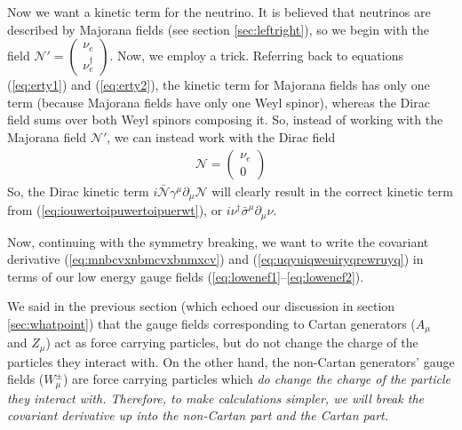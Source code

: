 \documentclass[12pt,epsf]{article}
\def\nolabel{\nonumber }
\def\nolabel{\nonumber }
\begin{document}
Now we want a kinetic term for the neutrino.  It is believed that
neutrinos are described by Majorana fields (see section
\ref{sec:leftright}), so we begin with the field $\mathcal{N}' = 
\begin{pmatrix} \nu_e \\ \nu^{\dagger}_e \end{pmatrix}$.  Now, we
employ a trick.  Referring back to equations (\ref{eq:erty1}) and
(\ref{eq:erty2}), the kinetic term for Majorana fields has only one
term (because Majorana fields have only one Weyl spinor), whereas the
Dirac field sums over both Weyl spinors composing it.  So, instead of
working with the Majorana field $\mathcal{N}'$, we can instead work
with the Dirac field
\begin{eqnarray}
\mathcal{N} = \begin{pmatrix} \nu_e \\ 0\end{pmatrix}\nolabel
\end{eqnarray}
So, the Dirac kinetic term $i \mathcal{\bar N}
\gamma^{\mu}\partial_{\mu} \mathcal{N}$ will clearly result in the
correct kinetic term from (\ref{eq:iouwertoipuwertoipuerwt}), or
$i\nu^{\dagger}\bar \sigma^{\mu}\partial_{\mu}\nu$.  

Now, continuing with the symmetry breaking, we want to write the
covariant derivative (\ref{eq:mnbcvxnbmcvxbnmxcv}) and
(\ref{eq:uqyuiqweuiryqrewruyq}) in terms of our low energy gauge fields
(\ref{eq:lowenef1}--\ref{eq:lowenef2}).  

We said in the previous section (which echoed our discussion in section
\ref{sec:whatpoint}) that the gauge fields corresponding to Cartan
generators ($A_{\mu}$ and $Z_{\mu}$) act as force carrying particles,
but do not change the charge of the particles they interact with.  On
the other hand, the non-Cartan generators' gauge fields
($W^{\pm}_{\mu}$) are force carrying particles which \it do \rm change
the charge of the particle they interact with.	Therefore, to make
calculations simpler, we will break the covariant derivative up into
the non-Cartan part and the Cartan part.  
\end{document}
